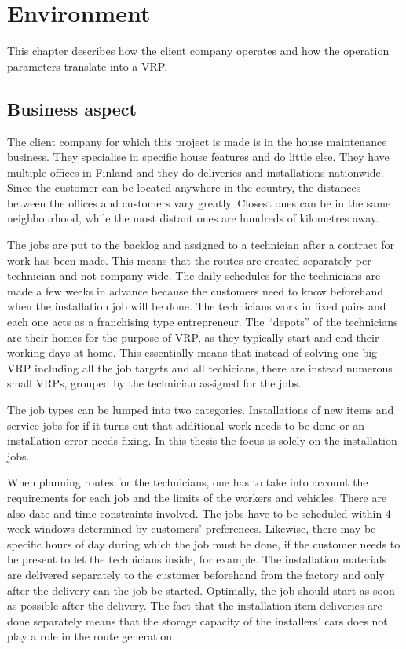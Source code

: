 \chapter{Environment}
\label{chapter:environment}
This chapter describes how the client company operates and how the operation parameters translate into a VRP. 


\section{Business aspect}
The client company for which this project is made is in the house maintenance business. They specialise in specific house features and do little else. They have multiple offices in Finland and they do deliveries and installations nationwide. Since the customer can be located anywhere in the country, the distances between the offices and customers vary greatly. Closest ones can be in the same neighbourhood, while the most distant ones are hundreds of kilometres away.

The jobs are put to the backlog and assigned to a technician after a contract for work has been made. This means that the routes are created separately per technician and not company-wide. The daily schedules for the technicians are made a few weeks in advance because the customers need to know beforehand when the installation job will be done. The technicians work in fixed pairs and each one acts as a franchising type entrepreneur. The ``depots'' of the technicians are their homes for the purpose of VRP, as they typically start and end their working days at home. This essentially means that instead of solving one big VRP including all the job targets and all techicians, there are instead numerous small VRPs, grouped by the technician assigned for the jobs. 

The job types can be lumped into two categories. Installations of new items and service jobs for if it turns out that additional work needs to be done or an installation error needs fixing. In this thesis the focus is solely on the installation jobs.

When planning routes for the technicians, one has to take into account the requirements for each job and the limits of the workers and vehicles. There are also date and time constraints involved. The jobs have to be scheduled within 4-week windows determined by customers' preferences. Likewise, there may be specific hours of day during which the job must be done, if the customer needs to be present to let the technicians inside, for example. The installation materials are delivered separately to the customer beforehand from the factory and only after the delivery can the job be started. Optimally, the job should start as soon as possible after the delivery. The fact that the installation item deliveries are done separately means that the storage capacity of the installers' cars does not play a role in the route generation. 

